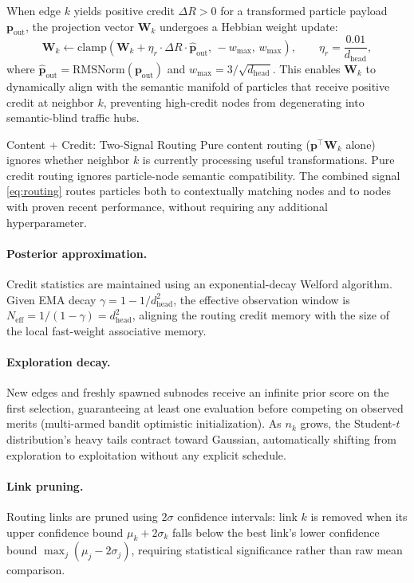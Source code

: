 \documentclass[11pt,a4paper]{article}
\theoremstyle{definition}
\newcommand{\vp}{\mathbf{p}}
\newcommand{\mW}{\mathbf{W}}
\newcommand{\RMSNorm}{\mathrm{RMSNorm}}
\newcommand{\clamp}{\mathrm{clamp}}
\begin{document}
When edge $k$ yields positive credit $\Delta R > 0$ for a transformed particle payload $\vp_\text{out}$,
the projection vector $\mW_k$ undergoes a Hebbian weight update:
\begin{equation}
  \mW_k \leftarrow \clamp\!\left(\mW_k + \eta_r \cdot \Delta R \cdot \hat{\vp}_\text{out},\, -w_\text{max},\, w_\text{max}\right),
  \qquad \eta_r = \frac{0.01}{d_\text{head}},
  \label{eq:routing_hebbian}
\end{equation}
where $\hat{\vp}_\text{out} = \RMSNorm(\vp_\text{out})$ and $w_\text{max} = 3/\sqrt{d_\text{head}}$.
This enables $\mW_k$ to dynamically align with the semantic manifold of particles that receive positive credit at neighbor $k$, preventing high-credit nodes from degenerating into semantic-blind traffic hubs.

\begin{designbox}{Content + Credit: Two-Signal Routing}
  Pure content routing ($\vp^\top \mW_k$ alone) ignores whether neighbor $k$ is
  currently processing useful transformations.
  Pure credit routing ignores particle-node semantic compatibility.
  The combined signal \eqref{eq:routing} routes particles both to contextually matching nodes
  and to nodes with proven recent performance, without requiring any additional hyperparameter.
\end{designbox}

\paragraph{Posterior approximation.}
Credit statistics are maintained using an exponential-decay Welford algorithm.
Given EMA decay $\gamma = 1 - 1/d_\text{head}^2$, the effective observation window is
$N_\text{eff} = 1/(1-\gamma) = d_\text{head}^2$,
aligning the routing credit memory with the size of the local fast-weight associative memory.

\paragraph{Exploration decay.}
New edges and freshly spawned subnodes receive an infinite prior score on the first selection,
guaranteeing at least one evaluation before competing on observed merits (multi-armed bandit
optimistic initialization).
As $n_k$ grows, the Student-$t$ distribution's heavy tails contract toward Gaussian,
automatically shifting from exploration to exploitation without any explicit schedule.

\paragraph{Link pruning.}
Routing links are pruned using $2\sigma$ confidence intervals: link $k$ is removed when
its upper confidence bound $\mu_k + 2\sigma_k$ falls below the best link's lower confidence
bound $\max_j(\mu_j - 2\sigma_j)$, requiring statistical significance rather than raw mean comparison.
\end{document}

